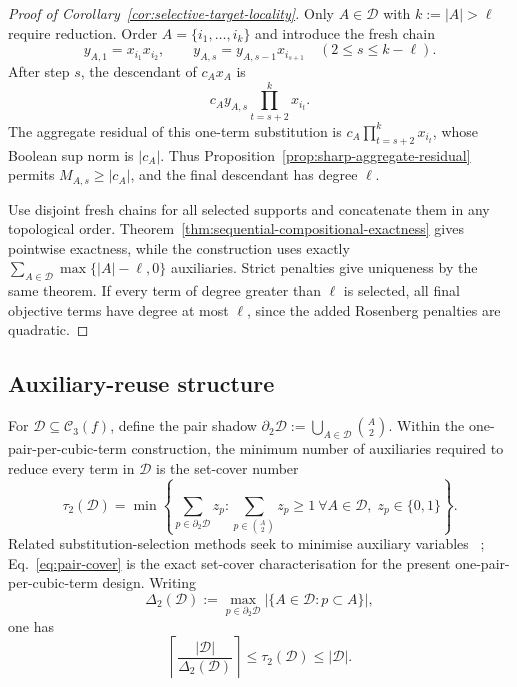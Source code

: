 \documentclass[a4paper,onecolumn,11pt,unpublished]{quantumarticle}
\theoremstyle{remark}
\begin{document}
\begin{proof}[Proof of Corollary~\ref{cor:selective-target-locality}]
Only \(A\in\mathcal D\) with \(k:=|A|>\ell\) require reduction.  Order
\(A=\{i_1,\ldots,i_k\}\) and introduce the fresh chain
\begin{equation}
  y_{A,1}=x_{i_1}x_{i_2},
  \qquad
  y_{A,s}=y_{A,s-1}x_{i_{s+1}}
  \quad(2\leq s\leq k-\ell).
  \label{eq:fresh-chain}
\end{equation}
After step \(s\), the descendant of \(c_Ax_A\) is
\begin{equation}
  c_Ay_{A,s}\prod_{t=s+2}^{k}x_{i_t}.
  \label{eq:fresh-chain-descendant}
\end{equation}
The aggregate residual of this one-term substitution is
\(c_A\prod_{t=s+2}^{k}x_{i_t}\), whose Boolean sup norm is \(|c_A|\).
Thus Proposition~\ref{prop:sharp-aggregate-residual} permits
\(M_{A,s}\geq|c_A|\), and the final descendant has degree \(\ell\).

Use disjoint fresh chains for all selected supports and concatenate them in
any topological order.  Theorem~\ref{thm:sequential-compositional-exactness}
gives pointwise exactness, while the construction uses exactly
\(\sum_{A\in\mathcal D}\max\{|A|-\ell,0\}\) auxiliaries.  Strict penalties
give uniqueness by the same theorem.  If every term of degree greater than
\(\ell\) is selected, all final objective terms have degree at most
\(\ell\), since the added Rosenberg penalties are quadratic.
\end{proof}


\subsection{Auxiliary-reuse structure}
\label{app:cubic-structure}

For $\mathcal D\subseteq\mathcal C_3(f)$, define the pair shadow
\(
\partial_2\mathcal D
:=
\bigcup_{A\in\mathcal D}\binom{A}{2}.
\)
Within the one-pair-per-cubic-term construction, the minimum number of
auxiliaries required to reduce every term in $\mathcal D$ is the set-cover
number
\begin{equation}
\tau_2(\mathcal D)
=
\min
\left\{
\sum_{p\in\partial_2\mathcal D}z_p:
\sum_{p\in\binom{A}{2}}z_p\ge1\ \forall A\in\mathcal D,\;
z_p\in\{0,1\}
\right\}.
\label{eq:pair-cover}
\end{equation}
Related substitution-selection methods seek to minimise auxiliary variables
~\cite{VermaLewis2020,VermaLewisKochenberger2021,Schmidbauer2026};
Eq.~\eqref{eq:pair-cover} is the exact set-cover characterisation for the
present one-pair-per-cubic-term design.
Writing
\[
\Delta_2(\mathcal D)
:=
\max_{p\in\partial_2\mathcal D}
|\{A\in\mathcal D:p\subset A\}|,
\]
one has
\[
\left\lceil
\frac{|\mathcal D|}{\Delta_2(\mathcal D)}
\right\rceil
\le
\tau_2(\mathcal D)
\le
|\mathcal D|.
\]
\end{document}
